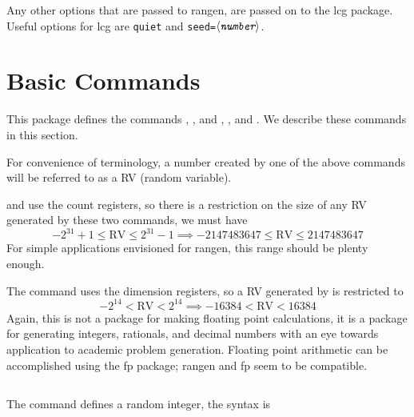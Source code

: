 \documentclass[12pt]{article}
\def\anglemeta#1{\ensuremath{\langle\textit{\texttt{#1}}\rangle}}
\def\meta#1{\textit{\texttt{#1}}}
\let\meta\anglemeta
\let\pkg\textsf
\begin{document}
Any other options that are passed to \pkg{rangen}, are passed on to the \textsf{lcg} package.
Useful options for \pkg{lcg} are \texttt{quiet} and \texttt{seed=\meta{number}}.


\section{Basic Commands}

This package defines the commands ,
, and , , and . We describe
these commands in this section.

For convenience of terminology, a number created by one of the above commands
will be referred to as a RV (random variable).

 and  use the count registers, so there is a restriction
on the size of any RV generated by these two commands, we must have
\begin{equation*}
    -2^{31}+1 \leq \text{RV} \leq  2^{31}-1\implies
    -2147483647 \leq \text{RV} \leq 2147483647
\end{equation*}
For simple applications envisioned for \pkg{rangen}, this range should be plenty
enough.

The  command uses the dimension registers, so a RV generated by
 is restricted to
\begin{equation*}
    -2^{14} < \text{RV} <  2^{14}\implies
    -16384 < \text{RV} < 16384
\end{equation*}
Again, this is not a package for making floating point calculations, it is a package
for generating integers, rationals, and decimal numbers with an eye towards application
to academic problem generation. Floating point arithmetic can be accomplished using
the \textsf{fp} package; \pkg{rangen} and \textsf{fp} seem to be compatible.

\subsection{\texorpdfstring{\protect{}}{}}

The command  defines a random integer, the syntax is
\end{document}
